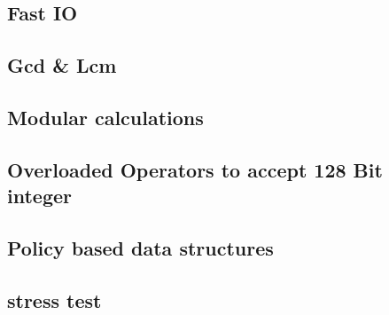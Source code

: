 \subsection{Fast IO}
\raggedbottom
\hrulefill
\subsection{Gcd \& Lcm}
\raggedbottom
\hrulefill
\subsection{Modular calculations}
\raggedbottom
\hrulefill
\subsection{Overloaded Operators to accept 128 Bit integer}
\raggedbottom
\hrulefill
\subsection{Policy based data structures}
\raggedbottom
\hrulefill
\subsection{stress test}
\raggedbottom
\hrulefill
